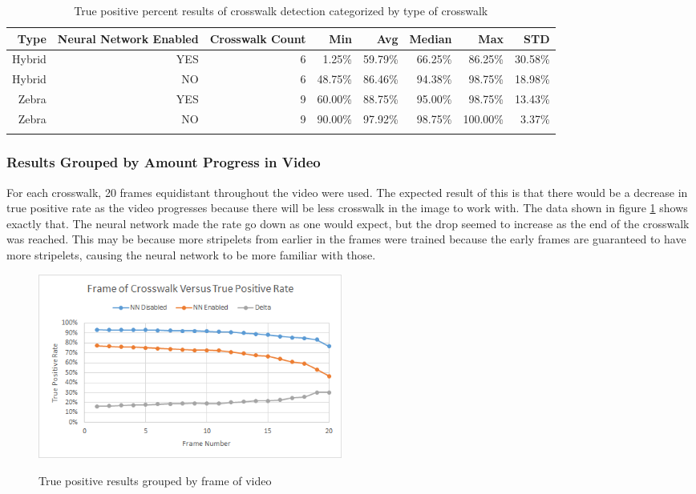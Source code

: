 \documentclass[12pt]{ucthesis}
\newcommand{\captionfonts}{\small\bf\ssp}
\begin{document}
\begin{center}
    \begin{longtable}[H]{|r|r|r|r|r|r|r|r|}
    \hline
    Type & \multicolumn{1}{l|}{Neural Network Enabled} & Crosswalk Count & Min & Avg & Median & Max & STD \bigstrut\\
    \hline
    Hybrid & YES & 6  & 1.25\% & 59.79\% & 66.25\% & 86.25\% & 30.58\% \bigstrut\\
    \hline
    Hybrid & NO & 6  & 48.75\% & 86.46\% & 94.38\% & 98.75\% & 18.98\% \bigstrut\\
    \hline
    Zebra & YES & 9  & 60.00\% & 88.75\% & 95.00\% & 98.75\% & 13.43\% \bigstrut\\
    \hline
    Zebra & NO & 9  & 90.00\% & 97.92\% & 98.75\% & 100.00\% & 3.37\% \bigstrut\\
    \hline



    \caption{True positive percent results of crosswalk detection categorized by type of crosswalk}
    \label{tab:typeOfCwalk} 
    \end{longtable}
\end{center}

\subsubsection{Results Grouped by Amount Progress in Video}

For each crosswalk, 20 frames equidistant throughout the video were used. The expected result of this is that there would be a decrease in true positive rate as the video progresses because there will be less crosswalk in the image to work with. The data shown in figure \ref{fig:graphOfFrameCount} shows exactly that. The neural network made the rate go down as one would expect, but the drop seemed to increase as the end of the crosswalk was reached. This may be because more stripelets from earlier in the frames were trained because the early frames are guaranteed to have more stripelets, causing the neural network to be more familiar with those. 

\begin{figure}[H]
\begin{center}
\includegraphics[width=10cm]{FrameResultsGraph.png}
\captionfonts
\caption[True Positives Grouped by Frame of Video]{True positive results grouped by frame of video}
\label{fig:graphOfFrameCount}
\end{center}
\end{figure}
\end{document}
